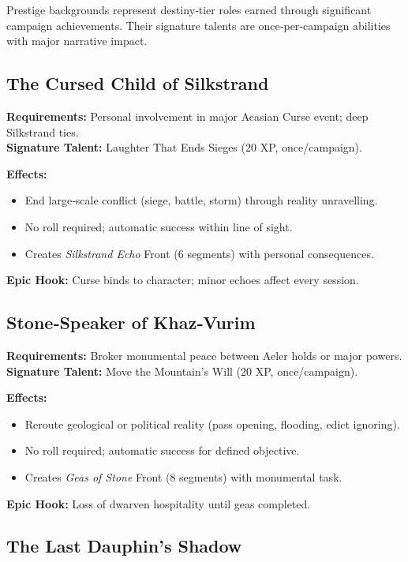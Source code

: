 Prestige backgrounds represent destiny‑tier roles earned through significant campaign achievements. Their signature talents are once‑per‑campaign abilities with major narrative impact.

\subsection{The Cursed Child of Silkstrand}\label{subsec:cursed_child}

\textbf{Requirements:} Personal involvement in major Acasian Curse event; deep Silkstrand ties.\\
\textbf{Signature Talent:} Laughter That Ends Sieges (20 XP, once/campaign).

\textbf{Effects:}
\begin{itemize}
    \item End large‑scale conflict (siege, battle, storm) through reality unravelling.
    \item No roll required; automatic success within line of sight.
    \item Creates \emph{Silkstrand Echo} Front (6 segments) with personal consequences.
\end{itemize}
\textbf{Epic Hook:} Curse binds to character; minor echoes affect every session.

\subsection{Stone‑Speaker of Khaz‑Vurim}\label{subsec:stone_speaker}

\textbf{Requirements:} Broker monumental peace between Aeler holds or major powers.\\
\textbf{Signature Talent:} Move the Mountain's Will (20 XP, once/campaign).

\textbf{Effects:}
\begin{itemize}
    \item Reroute geological or political reality (pass opening, flooding, edict ignoring).
    \item No roll required; automatic success for defined objective.
    \item Creates \emph{Geas of Stone} Front (8 segments) with monumental task.
\end{itemize}
\textbf{Epic Hook:} Loss of dwarven hospitality until geas completed.

\subsection{The Last Dauphin's Shadow}\label{subsec:dauphin_shadow}

